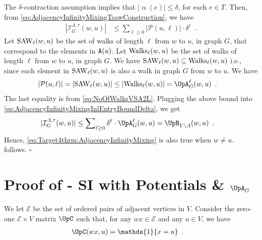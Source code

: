 \documentclass[11pt,reqno]{amsart}
\numberwithin{equation}{section}
\newcommand{\cE}{{\mathcal{E}}}
\newcommand{\cI}{{\mathcal{I}}}
\newcommand{\cP}{{\mathcal{P}}}
\newcommand{\applegreen}[1]{ {\color{applegreen}#1}}
\newcommand{\blue}[1]{{\color{blue}#1}}
\newcommand{\bluepigment}[1]{{\color{blue(pigment)}#1}}
\newcommand{\heliotrope}[1]{{\color{heliotrope}#1}}
\newcommand{\iris}[1]{{\color{iris}#1}}
\newcommand{\red}[1]{{\color{red}#1}}
\newcommand{\Ind}{\mathds{1}}
\newcommand{\ExtV}{\iris{\cE}}
\newcommand{\cp}{{\tt A}}
\newcommand{\infmatrix}{\cI}
\newcommand{\abs}[1]{\blue{|}#1\blue{|}}
\newcommand{\Adjacency}{{\UpA}}
\newcommand{\powadj}{{{\UpB}}}
\newcommand{\EdgeToV}{\UpC}
\newcommand{\spreadpoint}{\newpage}
\newcommand{\LastReviewG}[1]{{\color{magenta}\hspace{.2cm} [Rev: \textrm{#1} - \bluepigment{G} ] \hspace{.2cm}}}
\renewcommand{\LastReviewG}[1]{}
\renewcommand{\spreadpoint}{}
\renewcommand{\applegreen}[1]{#1}
\renewcommand{\blue}[1]{#1}
\renewcommand{\bluepigment}[1]{#1}
\renewcommand{\heliotrope}[1]{#1}
\renewcommand{\iris}[1]{#1}
\renewcommand{\red}[1]{#1}
\newcommand{\saw}{{\rm SAW}}
\newcommand{\ke}{\blue{e}}
\newcommand{\kell}{{\color{green(pigment)}\ell}}%
\newcommand{\ku}{\red{u}}
\newcommand{\kw}{\blue{w}}
\newcommand{\kx}{\heliotrope{x}}
\renewcommand{\ke}{e}
\renewcommand{\kell}{\ell}
\renewcommand{\ku}{u}
\renewcommand{\kw}{w}
\renewcommand{\kx}{x}
\newcommand{\infweight}{\upalpha}
\begin{document}
The  $\delta$-contraction assumption implies  that $\abs{\infweight(\ke)} \leq \delta$,
for each $\ke\in T$. Then,  
from \eqref{eq:AdjacencyInfinityMixingTsawConstruction},  we have 
% 
\begin{align}\label{eq:AdjacencyInfinityMixingInlEntryBoundDelta}
\abs{\infmatrix^{\Lambda,\tau}_{G} (\kw,\ku)}&\leq \sum\nolimits_{\kell\geq 0} \abs{\cP(\ku,\kell)} \cdot \delta^{\kell} \enspace. 
\end{align}
Let $\saw_{\kell}(\kw,\ku)$ be the set of walks of length $\kell$ from $\kw$ to $\ku$, in graph $G$, that correspond to the elements in 
$\cp(\ku)$. Let ${\rm Walks}_{\kell}(\kw,\ku)$ be the set of walks of length $\kell$ from $\kw$ to $\ku$, in graph $G$.  We have 
% 
$\saw_{\kell}(\kw,\ku)\subseteq {\rm Walks}_{\kell}(\kw,\ku)$  
% 
i.e., since each element in $\saw_{\kell}(\kw,\ku)$ is also a walk in graph $G$ from $\kw$ to $\ku$. We have 
\begin{align}\nonumber 
\abs{\cP(\ku,\kell)} &= \abs{\saw_{\kell}(\kw,\ku)} \leq \abs{{\rm Walks}_{\kell}(\kw,\ku)} = \Adjacency^{\kell}_G(\kw,\ku) \enspace.
\end{align}
% 
The last equality is from \eqref{eq:NoOfWalksVSA2L}.
%
Plugging the above bound into \eqref{eq:AdjacencyInfinityMixingInlEntryBoundDelta}, we get 
\begin{align}\nonumber 
\abs{\infmatrix^{\Lambda,\tau}_{G} (\kw,\ku)} &\leq \sum\nolimits_{\kell\geq 0} \delta^{\kell} \cdot \Adjacency^{\kell}_G(\kw,\ku)=\powadj_{V\setminus \Lambda}(\kw,\ku) \enspace. 
\end{align}
Hence, \eqref{eq:Target4thrm:AdjacencyInfinityMixing} is also true when $\kw\neq \ku$.
%
 follows. \hfill $\square$


\spreadpoint






\section{Proof of  - SI with Potentials \& $\Adjacency_G$ \LastReviewG{2025-03-11}}\label{sec:thrm:AdjacencyPotentialSpIn}


We let $\ExtV$ be the set of ordered pairs of adjacent vertices in $V$. Consider the zero-one
$\ExtV\times V$ matrix $\EdgeToV$ such that, for any $\kw\kx\in \ExtV$
and any $\ku\in V$, we have
\begin{align}\label{def:SingleEdgeM}
\EdgeToV(\kw\kx,\ku)&=\Ind\{\kx=\ku\}\enspace. 
\end{align}
\end{document}
